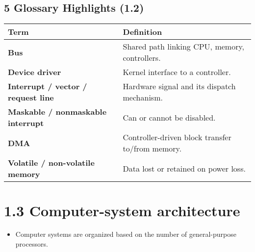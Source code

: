 \documentclass{article}
\begin{document}
\subsection*{5 Glossary Highlights (1.2)}
\centering
\begin{tabular}{>{\raggedright}p{} >{\raggedright\arraybackslash}p{}}
\toprule
\textbf{Term} & \textbf{Definition} \\
\midrule
\textbf{Bus} & Shared path linking CPU, memory, controllers. \\
\textbf{Device driver} & Kernel interface to a controller. \\
\textbf{Interrupt / vector / request line} & Hardware signal and its dispatch mechanism. \\
\textbf{Maskable / nonmaskable interrupt} & Can or cannot be disabled. \\
\textbf{DMA} & Controller-driven block transfer to/from memory. \\
\textbf{Volatile / non-volatile memory} & Data lost or retained on power loss. \\
\bottomrule
\end{tabular}
\vspace{\baselineskip}

\newpage
\section*{1.3 Computer-system architecture}
\begin{itemize}
    \item Computer systems are organized based on the number of general-purpose processors.
\end{itemize}
\end{document}
